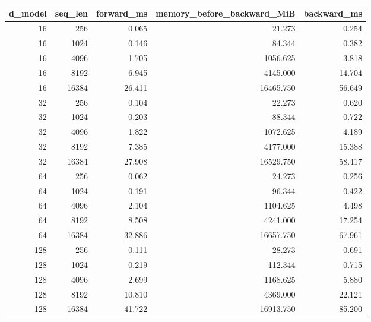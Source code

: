 \begin{tabular}{rrrrr}
\toprule
d_model & seq_len & forward_ms & memory_before_backward_MiB & backward_ms \\
\midrule
16 & 256 & 0.065 & 21.273 & 0.254 \\
16 & 1024 & 0.146 & 84.344 & 0.382 \\
16 & 4096 & 1.705 & 1056.625 & 3.818 \\
16 & 8192 & 6.945 & 4145.000 & 14.704 \\
16 & 16384 & 26.411 & 16465.750 & 56.649 \\
32 & 256 & 0.104 & 22.273 & 0.620 \\
32 & 1024 & 0.203 & 88.344 & 0.722 \\
32 & 4096 & 1.822 & 1072.625 & 4.189 \\
32 & 8192 & 7.385 & 4177.000 & 15.388 \\
32 & 16384 & 27.908 & 16529.750 & 58.417 \\
64 & 256 & 0.062 & 24.273 & 0.256 \\
64 & 1024 & 0.191 & 96.344 & 0.422 \\
64 & 4096 & 2.104 & 1104.625 & 4.498 \\
64 & 8192 & 8.508 & 4241.000 & 17.254 \\
64 & 16384 & 32.886 & 16657.750 & 67.961 \\
128 & 256 & 0.111 & 28.273 & 0.691 \\
128 & 1024 & 0.219 & 112.344 & 0.715 \\
128 & 4096 & 2.699 & 1168.625 & 5.880 \\
128 & 8192 & 10.810 & 4369.000 & 22.121 \\
128 & 16384 & 41.722 & 16913.750 & 85.200 \\
\bottomrule
\end{tabular}
